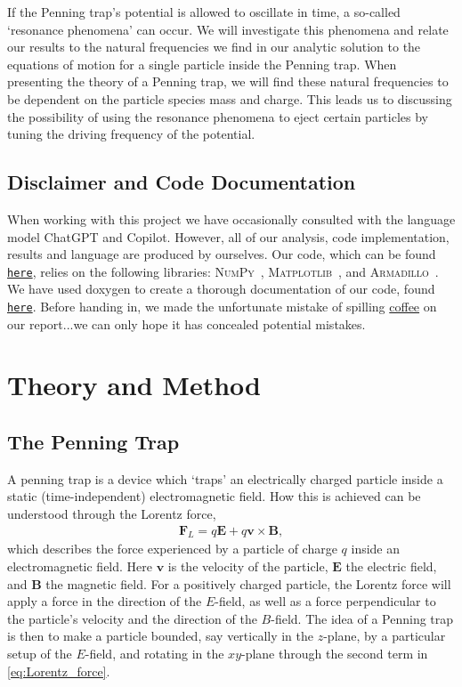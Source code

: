 \documentclass[english,notitlepage,reprint]{revtex4-2}  %
\renewcommand{\vec}[1]{\mathbf{#1}}
\begin{document}
If the Penning trap's potential is allowed to oscillate in time, a so-called `resonance phenomena' can occur.\cite{uioFYS3150H25} 
We will investigate this phenomena and relate our results to the natural frequencies we find in our analytic solution to the equations of motion for a single particle inside the Penning trap. 
When presenting the theory of a Penning trap, we will find these natural frequencies to be dependent on the particle species mass and charge. This leads us to discussing the possibility of using the resonance phenomena to eject certain particles by tuning the driving frequency of the potential.

\subsection*{Disclaimer and Code Documentation}
When working with this project we have occasionally consulted with the language model ChatGPT and Copilot. However, all of our analysis, code implementation, results and language are produced by ourselves. Our code, which can be found \href{https://github.uio.no/icrukan/FYS4150/tree/master/Project3/code}{\texttt{here}}, relies on the following libraries: \textsc{NumPy}~\cite{numpy}, \textsc{Matplotlib}~\cite{matplotlib}, and \textsc{Armadillo}~\cite{armadillo}. We have used doxygen to create a thorough documentation of our code, found \href{https://github.uio.no/icrukan/FYS4150/blob/master/Project3/docs/doc.pdf}{\texttt{here}}. Before handing in, we made the unfortunate mistake of spilling \href{https://ctan.org/pkg/coffeestains?lang=en}{coffee} on our report...we can only hope it has concealed potential mistakes. 


\section{Theory and Method}
\subsection{The Penning Trap}
A penning trap is a device which `traps' an electrically charged particle inside a static (time-independent) electromagnetic field. How this is achieved can be understood through the Lorentz force,
\begin{align}
    \vec{F}_{L} = q\vec{E} + q\vec{v}\times \vec{B},    \label{eq:Lorentz_force}
\end{align}
which describes the force experienced by a particle of charge \(q\) inside an electromagnetic field. Here \(\vec{v}\) is the velocity of the particle, \(\vec{E}\) the electric field, and \(\vec{B}\) the magnetic field. For a positively charged particle, the Lorentz force will apply a force in the direction of the \(E\)-field, as well as a force perpendicular to the particle's velocity and the direction of the \(B\)-field. The idea of a Penning trap is then to make a particle bounded, say vertically in the \(z\)-plane, by a particular setup of the \(E\)-field, and rotating in the \(xy\)-plane through the second term in \eqref{eq:Lorentz_force}.
\end{document}

